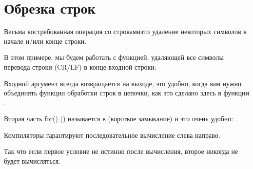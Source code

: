 \section{Обрезка строк}
\newcommand{\CRLF}{\ac{CR}/\ac{LF}}

Весьма востребованная операция со строками\EMDASH{}это удаление некоторых символов в начале и/или конце
строки.

В этом примере, мы будем работать с функцией, удаляющей все символы перевода строки 
(\CRLF{}) в конце входной строки:



Входной аргумент всегда возвращается на выходе, это удобно, когда вам нужно объединять
функции обработки строк в цепочки, как это сделано здесь в функции \main.

Вторая часть for() () называется в \CCpp {} 
(короткое замыкание) и это очень удобно: .

Компиляторы \CCpp гарантируют последовательное вычисление слева направо.

Так что если первое условие не истинно после вычисления, второе никогда не будет
вычисляться.






